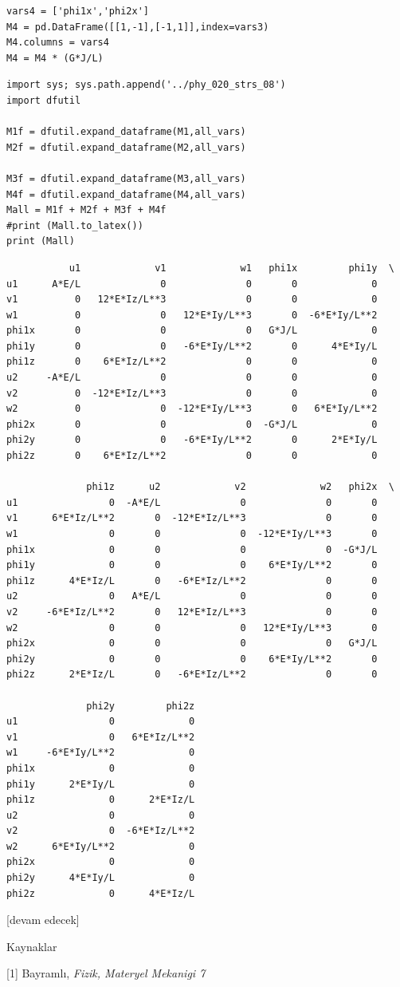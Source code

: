 \documentclass[12pt,fleqn]{article}\usepackage{../../common}
\begin{document}
\begin{verbatim}
vars4 = ['phi1x','phi2x']
M4 = pd.DataFrame([[1,-1],[-1,1]],index=vars3)
M4.columns = vars4
M4 = M4 * (G*J/L)
\end{verbatim}

\begin{verbatim}
import sys; sys.path.append('../phy_020_strs_08')
import dfutil

M1f = dfutil.expand_dataframe(M1,all_vars)
M2f = dfutil.expand_dataframe(M2,all_vars)

M3f = dfutil.expand_dataframe(M3,all_vars)
M4f = dfutil.expand_dataframe(M4,all_vars)
Mall = M1f + M2f + M3f + M4f
#print (Mall.to_latex())
print (Mall)
\end{verbatim}

\begin{verbatim}
           u1             v1             w1   phi1x         phi1y  \
u1      A*E/L              0              0       0             0   
v1          0   12*E*Iz/L**3              0       0             0   
w1          0              0   12*E*Iy/L**3       0  -6*E*Iy/L**2   
phi1x       0              0              0   G*J/L             0   
phi1y       0              0   -6*E*Iy/L**2       0      4*E*Iy/L   
phi1z       0    6*E*Iz/L**2              0       0             0   
u2     -A*E/L              0              0       0             0   
v2          0  -12*E*Iz/L**3              0       0             0   
w2          0              0  -12*E*Iy/L**3       0   6*E*Iy/L**2   
phi2x       0              0              0  -G*J/L             0   
phi2y       0              0   -6*E*Iy/L**2       0      2*E*Iy/L   
phi2z       0    6*E*Iz/L**2              0       0             0   

              phi1z      u2             v2             w2   phi2x  \
u1                0  -A*E/L              0              0       0   
v1      6*E*Iz/L**2       0  -12*E*Iz/L**3              0       0   
w1                0       0              0  -12*E*Iy/L**3       0   
phi1x             0       0              0              0  -G*J/L   
phi1y             0       0              0    6*E*Iy/L**2       0   
phi1z      4*E*Iz/L       0   -6*E*Iz/L**2              0       0   
u2                0   A*E/L              0              0       0   
v2     -6*E*Iz/L**2       0   12*E*Iz/L**3              0       0   
w2                0       0              0   12*E*Iy/L**3       0   
phi2x             0       0              0              0   G*J/L   
phi2y             0       0              0    6*E*Iy/L**2       0   
phi2z      2*E*Iz/L       0   -6*E*Iz/L**2              0       0   

              phi2y         phi2z  
u1                0             0  
v1                0   6*E*Iz/L**2  
w1     -6*E*Iy/L**2             0  
phi1x             0             0  
phi1y      2*E*Iy/L             0  
phi1z             0      2*E*Iz/L  
u2                0             0  
v2                0  -6*E*Iz/L**2  
w2      6*E*Iy/L**2             0  
phi2x             0             0  
phi2y      4*E*Iy/L             0  
phi2z             0      4*E*Iz/L  
\end{verbatim}


[devam edecek]

Kaynaklar

[1] Bayramlı, {\em Fizik, Materyel Mekanigi 7}
\end{document}
